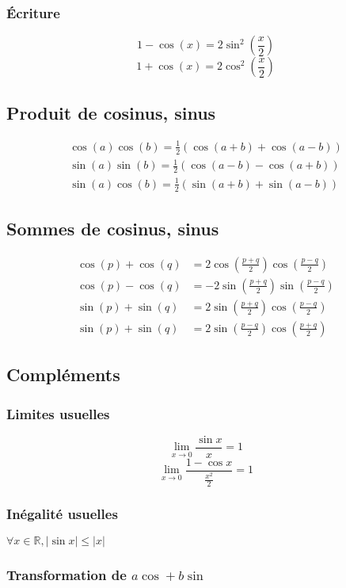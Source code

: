 \documentclass[12pt,a4paper,french]{book}
\begin{document}
			\subsubsection{Écriture}
			\[1-\cos(x) = 2\sin^{2}(\frac{x}{2})\]
			\[1+\cos(x) = 2\cos^{2}(\frac{x}{2})\]
		\subsection{Produit de cosinus, sinus}
			\begin{align*}
				\cos(a)\cos(b) = \frac{1}{2}(\cos(a+b)+\cos(a-b))\\
				\sin(a)\sin(b) = \frac{1}{2}(\cos(a-b)-\cos(a+b)) \\
				\sin(a)\cos(b) = \frac{1}{2}(\sin(a+b)+\sin(a-b))
			\end{align*}
		\subsection{Sommes de cosinus, sinus}
			\begin{align*}
				\cos(p)+\cos(q) &= 2\cos\left( \frac{p+q}{2}\right) \cos\left( \frac{p-q}{2}\right)\\
				\cos(p)-\cos(q) &= -2\sin\left( \frac{p+q}{2}\right) \sin\left( \frac{p-q}{2}\right)\\
				\sin(p)+\sin(q) &= 2\sin\left( \frac{p+q}{2}\right) \cos\left( \frac{p-q}{2}\right)\\
				\sin(p)+\sin(q) &= 2\sin\left( \frac{p-q}{2}\right) \cos\left( \frac{p+q}{2}\right)
			\end{align*}
		\subsection{Compléments}
			\subsubsection{Limites usuelles}
				\[ \lim\limits_{x \to 0} \frac{\sin x}{x} = 1\]
				\[ \lim\limits_{x \to 0} \frac{1- \cos x}{\frac{x^{2}}{2}} = 1\]
			\subsubsection{Inégalité usuelles}
				$\forall x \in \mathbb{R}, \left|\sin x\right| \leqslant \left|x\right| $
			
			\subsubsection{Transformation de $a\cos + b\sin$}
\end{document}
